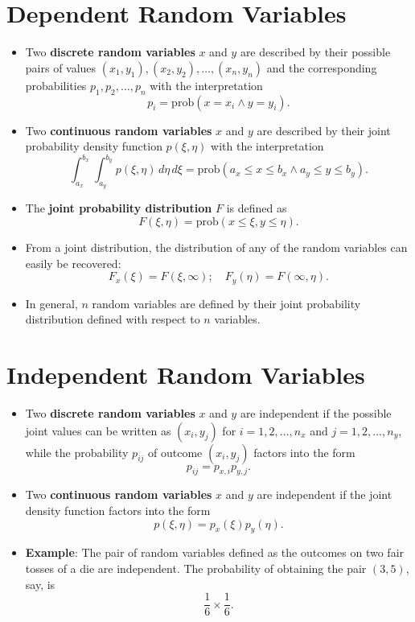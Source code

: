 \section{Dependent Random Variables}

\begin{itemize}[label=\textbullet]
    \item Two \textbf{discrete random variables} \( x \) and \( y \) are described by their possible pairs of values \( (x_1, y_1), (x_2, y_2), \ldots, (x_n, y_n) \) and the corresponding probabilities \( p_1, p_2, \ldots, p_n \) with the interpretation
    \[
    p_i = \text{prob}(x = x_i \land y = y_i).
    \]
    \item Two \textbf{continuous random variables} \( x \) and \( y \) are described by their joint probability density function \( p(\xi, \eta) \) with the interpretation
    \[
    \int_{a_x}^{b_x} \int_{a_y}^{b_y} p(\xi, \eta) \, d\eta \, d\xi = \text{prob}(a_x \leq x \leq b_x \land a_y \leq y \leq b_y).
    \]
\end{itemize}


\begin{itemize}[label=\textbullet]
    \item The \textbf{joint probability distribution} \( F \) is defined as
    \[
    F(\xi, \eta) = \text{prob}(x \leq \xi, y \leq \eta).
    \]
    \item From a joint distribution, the distribution of any of the random variables can easily be recovered:
    \[
    F_x(\xi) = F(\xi, \infty); \quad F_y(\eta) = F(\infty, \eta).
    \]
    \item In general, \( n \) random variables are defined by their joint probability distribution defined with respect to \( n \) variables.
\end{itemize}

\section{Independent Random Variables}

\begin{itemize}[label=\textbullet]
    \item Two \textbf{discrete random variables} \( x \) and \( y \) are independent if the possible joint values can be written as \( (x_i, y_j) \) for \( i = 1, 2, \ldots, n_x \) and \( j = 1, 2, \ldots, n_y \), while the probability \( p_{ij} \) of outcome \( (x_i, y_j) \) factors into the form
    \[
    p_{ij} = p_{x,i} p_{y,j}.
    \]
    \item Two \textbf{continuous random variables} \( x \) and \( y \) are independent if the joint density function factors into the form
    \[
    p(\xi, \eta) = p_x(\xi) p_y(\eta).
    \]
    \item \textbf{Example}: The pair of random variables defined as the outcomes on two fair tosses of a die are independent. The probability of obtaining the pair \((3, 5)\), say, is
    \[
    \frac{1}{6} \times \frac{1}{6}.
    \]
\end{itemize}

